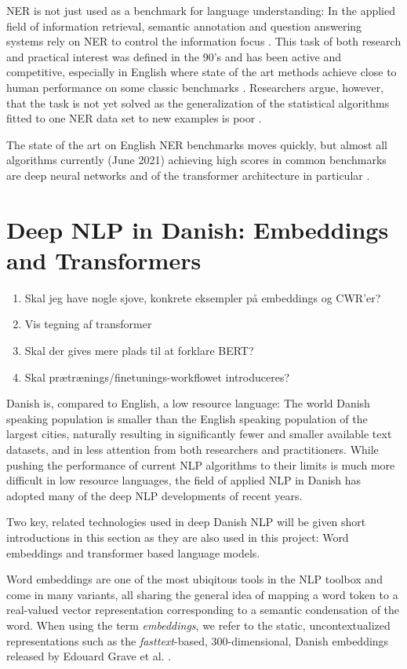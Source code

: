\documentclass[main.tex]{subfiles}
\begin{document}
NER is not just used as a benchmark for language understanding:
In the applied field of information retrieval, semantic annotation and question answering systems rely on NER to control the information focus \cite[Sec. 2]{marrero2013ner}.
This task of both research and practical interest was defined in the 90's and has been active and competitive, especially in English where state of the art methods achieve close to human performance on some classic benchmarks \cite{wiki2021ner, marrero2013ner}.
Researchers argue, however, that the task is not yet solved as the generalization of the statistical algorithms fitted to one NER data set to new examples is poor \cite[Sec. 7.2]{marrero2013ner}.

The state of the art on English NER benchmarks moves quickly, but almost all algorithms currently (June 2021) achieving high scores in common benchmarks are deep neural networks and of the transformer architecture in particular \cite{ruder21ner, pwc21ner}.

\section{Deep NLP in Danish: Embeddings and Transformers}
\label{sec:nlpda}
\begin{enumerate}
    \item Skal jeg have nogle sjove, konkrete eksempler på embeddings og CWR'er?
    \item Vis tegning af transformer
    \item Skal der gives mere plads til at forklare BERT?
    \item Skal prætrænings/finetunings-workflowet introduceres?
\end{enumerate}
Danish is, compared to English, a low resource language:
The world Danish speaking population is smaller than the English speaking population of the largest cities, naturally resulting in significantly fewer and smaller available text datasets, and in less attention from both researchers and practitioners.
While pushing the performance of current NLP algorithms to their limits is much more difficult in low resource languages, the field of applied NLP in Danish has adopted many of the deep NLP developments of recent years.

Two key, related technologies used in deep Danish NLP will be given short introductions in this section as they are also used in this project:
Word embeddings and transformer based language models.

Word embeddings are one of the most ubiqitous tools in the NLP toolbox and come in many variants, all sharing the general idea of mapping a word token to a real-valued vector representation corresponding to a semantic condensation of the word.
When using the term \emph{embeddings}, we refer to the static, uncontextualized representations such as the \emph{fasttext}-based, 300-dimensional, Danish embeddings released by Edouard Grave et al. \cite{grave2018learning}.
\end{document}
